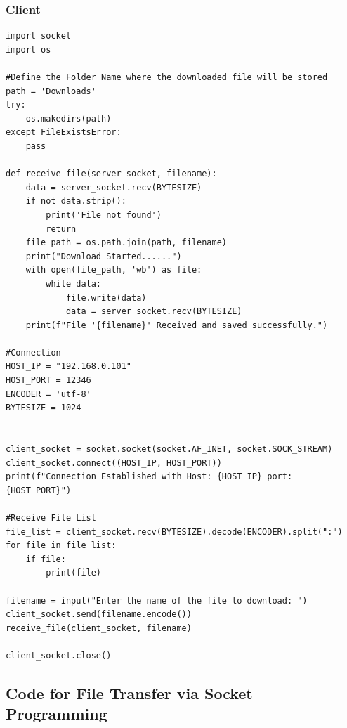 \documentclass[11pt]{article}
\begin{document}
\subsubsection*{Client}
\begin{verbatim}
import socket
import os

#Define the Folder Name where the downloaded file will be stored
path = 'Downloads'
try:
    os.makedirs(path)
except FileExistsError:
    pass

def receive_file(server_socket, filename):
    data = server_socket.recv(BYTESIZE)
    if not data.strip():
        print('File not found')
        return
    file_path = os.path.join(path, filename)
    print("Download Started......")
    with open(file_path, 'wb') as file:
        while data:
            file.write(data)
            data = server_socket.recv(BYTESIZE)
    print(f"File '{filename}' Received and saved successfully.")

#Connection
HOST_IP = "192.168.0.101"
HOST_PORT = 12346
ENCODER = 'utf-8'
BYTESIZE = 1024


client_socket = socket.socket(socket.AF_INET, socket.SOCK_STREAM)
client_socket.connect((HOST_IP, HOST_PORT))
print(f"Connection Established with Host: {HOST_IP} port: {HOST_PORT}")

#Receive File List
file_list = client_socket.recv(BYTESIZE).decode(ENCODER).split(":")
for file in file_list:
    if file:
        print(file)

filename = input("Enter the name of the file to download: ")
client_socket.send(filename.encode())
receive_file(client_socket, filename)

client_socket.close()
\end{verbatim}

\subsection*{Code for File Transfer via Socket Programming}
\end{document}
